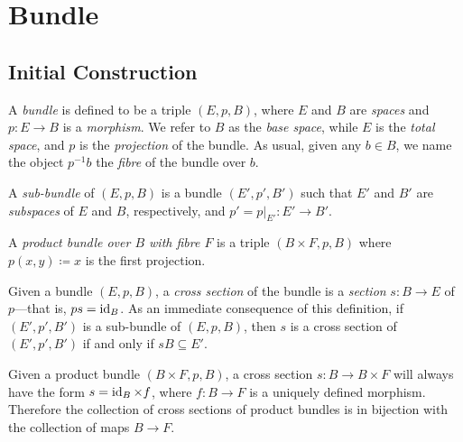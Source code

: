 \documentclass[../../../deep-dive]{subfile}
\begin{document}
\section{Bundle}

\subsection{Initial Construction}

\begin{definition}[Bundle]
\label{def:bundle}
A \emph{bundle} is defined to be a triple \((E, p, B)\), where \(E\) and \(B\)
are \emph{spaces} and \(p: E \to B\) is a \emph{morphism}. We refer to \(B\) as
the \emph{base space}, while \(E\) is the \emph{total space}, and \(p\) is the
\emph{projection} of the bundle. As usual, given any \(b \in B\), we name the
object \(p^{-1} b\) the \emph{fibre} of the bundle over \(b\).

A \emph{sub-bundle} of \((E, p, B)\) is a bundle \((E', p', B')\) such that
\(E'\) and \(B'\) are \emph{subspaces} of \(E\) and \(B\), respectively, and
\(p' = p|_{E'}: E' \to B'\).
\end{definition}

\begin{definition}
\label{def:product-bundle}
A \emph{product bundle over \(B\) with fibre \(F\)} is a triple
\((B \times F, p, B)\) where \(p(x, y) \coloneq x\) is the first projection.
\end{definition}

\begin{definition}
\label{def:cross-section-bundle}
Given a bundle \((E, p, B)\), a \emph{cross section} of the bundle is a
\emph{section} \(s: B \to E\) of \(p\)---that is, \(p s = \operatorname{id}_B\). As
an immediate consequence of this definition, if \((E', p', B')\) is a sub-bundle
of \((E, p, B)\), then \(s\) is a cross section of \((E', p', B')\) if and only
if \(s B \subseteq E'\).
\end{definition}

\begin{lemma}
\label{lem:cross-section-of-product-bundle}
Given a product bundle \((B \times F, p, B)\), a cross section
\(s: B \to B \times F\) will always have the form \(s = \operatorname{id}_B \times f\), where
\(f: B \to F\) is a uniquely defined morphism. Therefore the collection of cross
sections of product bundles is in bijection with the collection of maps
\(B \to F\).
\end{lemma}
\end{document}
